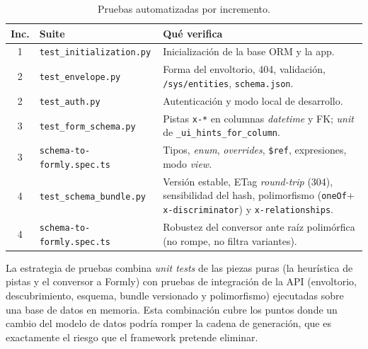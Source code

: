 \begin{table}[!htbp]
\caption{Pruebas automatizadas por incremento.}
\label{tab:tests}
\centering
\begin{tabular}{|c|l|p{6.2cm}|}
\hline
\textbf{Inc.} & \textbf{Suite} & \textbf{Qué verifica} \\ \hline
1 & \texttt{test\_initialization.py} & Inicialización de la base ORM y la app. \\ \hline
2 & \texttt{test\_\allowbreak envelope.\allowbreak py} & Forma del envoltorio, 404, validación,
\texttt{/sys/entities}, \texttt{schema.json}. \\ \hline
2 & \texttt{test\_auth.py} & Autenticación y modo local de desarrollo. \\ \hline
3 & \texttt{test\_\allowbreak form\_\allowbreak schema.\allowbreak py} & Pistas \texttt{x-*} en columnas
\emph{datetime} y FK; \emph{unit} de \texttt{\_\allowbreak ui\_\allowbreak hints\_\allowbreak for\_\allowbreak column}. \\ \hline
3 & \texttt{schema-\allowbreak to-\allowbreak formly.\allowbreak spec.\allowbreak ts} & Tipos, \emph{enum}, \emph{overrides},
\texttt{\$ref}, expresiones, modo \emph{view}. \\ \hline
4 & \texttt{test\_\allowbreak schema\_\allowbreak bundle.\allowbreak py} & Versión estable, ETag \emph{round-trip}
(304), sensibilidad del hash, polimorfismo (\texttt{oneOf}+
\texttt{x-\allowbreak discriminator}) y \texttt{x-\allowbreak relationships}. \\ \hline
4 & \texttt{schema-\allowbreak to-\allowbreak formly.\allowbreak spec.\allowbreak ts} & Robustez del conversor ante raíz
polimórfica (no rompe, no filtra variantes). \\ \hline
\end{tabular}
\end{table}

La estrategia de pruebas combina \emph{unit tests} de las piezas puras (la
heurística de pistas y el conversor a Formly) con pruebas de integración de la
API (envoltorio, descubrimiento, esquema, bundle versionado y polimorfismo)
ejecutadas sobre una base de datos en memoria. Esta combinación cubre los
puntos donde un cambio del modelo de datos podría romper la cadena de
generación, que es exactamente el riesgo que el framework pretende
eliminar.
